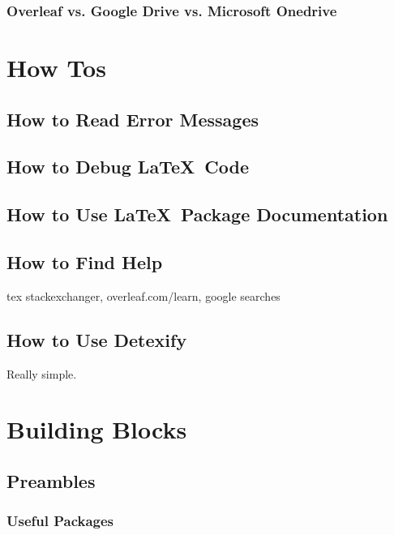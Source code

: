 \documentclass[12pt]{article}
\begin{document}
\subsubsection{Overleaf vs. Google Drive vs. Microsoft Onedrive}%
\label{feat-comp.table.collab-solns}

\section{How Tos}%
\label{how-to}

\subsection{How to Read Error Messages}%
\label{how-to.error-messages}

\subsection{How to Debug \LaTeX\ Code}%
\label{how-to.debug}

\subsection{How to Use \LaTeX\ Package Documentation}%
\label{how-to.package-docs}

\subsection{How to Find Help}%
\label{how-to.help}

tex stackexchanger, overleaf.com/learn, google searches

\subsection{How to Use Detexify}%
\label{how-to.detexify}

Really simple.

\section{Building Blocks}%
\label{bbs}

\subsection{Preambles}%
\label{bbs.preambles}

\subsubsection{Useful Packages}%
\label{bbs.preambles.packages}
\end{document}
